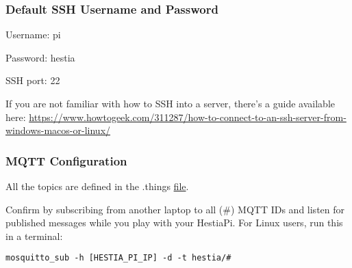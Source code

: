 \subsubsection{Default SSH Username and Password}

Username: pi

Password: hestia

SSH port: 22

If you are not familiar with how to SSH into a server, there's a guide available here:
\href{https://www.howtogeek.com/311287/how-to-connect-to-an-ssh-server-from-windows-macos-or-linux/}{https://www.howtogeek.com/311287/how-to-connect-to-an-ssh-server-from-windows-macos-or-linux/}

\subsubsection{MQTT Configuration}
All the topics are defined in the .things
\href{https://github.com/HestiaPi/hestia-touch-openhab/wiki/File-Structure-&-Paths-ONE}{file}.

Confirm by subscribing from another laptop to all (\#) MQTT IDs and listen for
published messages while you play with your HestiaPi. For Linux users, run this
in a terminal:

\texttt{mosquitto\_sub -h [HESTIA\_PI\_IP] -d -t hestia/\#}
